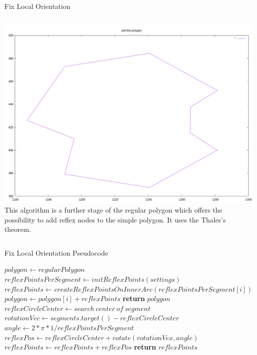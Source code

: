 \documentclass{beamer}
\begin{document}
\begin{frame}{Fix Local Orientation}
  \begin{block}{}
    \begin{columns}[onlytextwidth,T]
      \column{\dimexpr\linewidth-40mm}
      \includegraphics[width=0.5\paperwidth]{figures/kk-fix-local-orientation-10-3-0.png}
      \column{40mm}
      This algorithm is a further stage of the regular polygon which offers the
      possibility to add reflex nodes to the simple polygon. It uses the
      Thales's theorem.
    \end{columns}
  \end{block}
\end{frame}

\begin{frame}{Fix Local Orientation Pseudocode}
  \begin{algorithm}[H]
    \scriptsize
    \begin{algorithmic}[0]
        \State $polygon \gets regularPolygon$
        \State $reflexPointsPerSegment \gets initReflexPoints(settings)$
          \State $reflexPoints \gets createReflexPointsOnInnerArc(reflexPointsPerSegment[i])$
          \State $polygon \gets polygon[i] + reflexPoints$
        \EndFor
        \State \textbf{return} $polygon$
      \EndProcedure
      \vspace{3pt}
        \State $reflexCircleCenter \gets search\ center\ of\ segment$
        \State $rotationVec \gets segments.target() - reflexCircleCenter$
        \State $angle \gets 2*\pi*1/reflexPointsPerSegment$
          \State $reflexPos \gets reflexCircleCenter + rotate(rotationVex, angle)$
          \State $reflexPoints \gets reflexPoints + reflexPos$
        \EndFor
        \State \textbf{return} $reflexPoints$
      \EndProcedure
    \end{algorithmic}
  \end{algorithm}
\end{frame}
\end{document}
